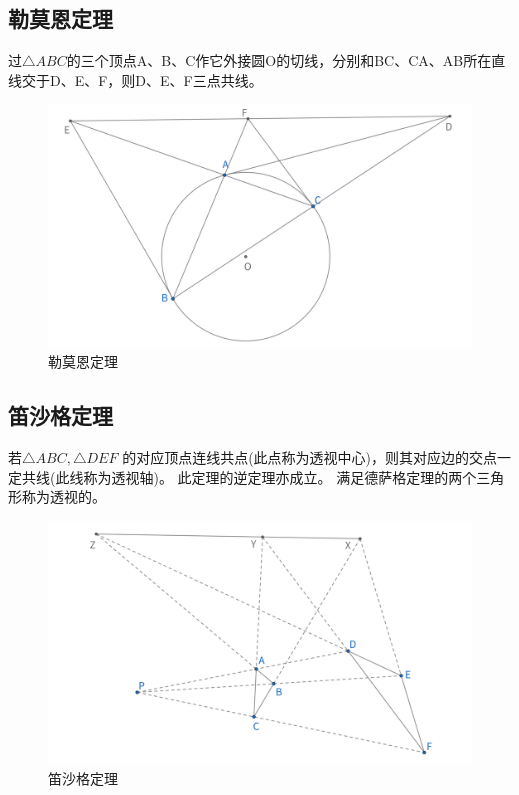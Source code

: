 \newpage
\subsection{勒莫恩定理}
\begin{theorem}
过$\triangle ABC$的三个顶点A、B、C作它外接圆O的切线，分别和BC、CA、AB所在直线交于D、E、F，则D、E、F三点共线。
\end{theorem}
\begin{figure}[htbp]
    \centering
    \includegraphics[width=\linewidth]{figures/勒莫恩定理.png}
    \caption{勒莫恩定理}
\end{figure}


\newpage
\subsection{笛沙格定理}
\begin{theorem}
若$\triangle ABC, \triangle DEF$ 的对应顶点连线共点(此点称为透视中心)，则其对应边的交点一定共线(此线称为透视轴)。
此定理的逆定理亦成立。
满足德萨格定理的两个三角形称为透视的。
\end{theorem}
\begin{figure}[htbp]
    \centering
    \includegraphics[width=\linewidth]{figures/笛沙格定理.png}
    \caption{笛沙格定理}
\end{figure}


